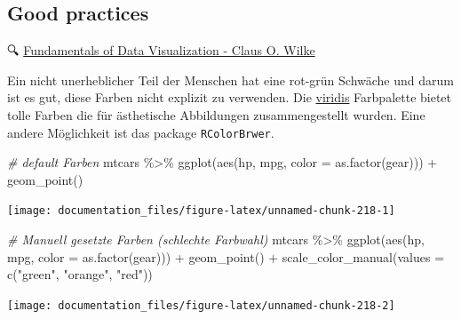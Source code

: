 \documentclass[
]{article}
\newenvironment{Shaded}{\begin{snugshade}}{\end{snugshade}}
\newcommand{\AttributeTok}[1]{\textcolor[rgb]{0.77,0.63,0.00}{#1}}
\newcommand{\CommentTok}[1]{\textcolor[rgb]{0.56,0.35,0.01}{\textit{#1}}}
\newcommand{\FunctionTok}[1]{\textcolor[rgb]{0.00,0.00,0.00}{#1}}
\newcommand{\NormalTok}[1]{#1}
\newcommand{\SpecialCharTok}[1]{\textcolor[rgb]{0.00,0.00,0.00}{#1}}
\newcommand{\StringTok}[1]{\textcolor[rgb]{0.31,0.60,0.02}{#1}}
\begin{document}
\hypertarget{good-practices}{%
\subsection{Good practices}\label{good-practices}}

🔍 \href{https://clauswilke.com/dataviz/index.html}{Fundamentals of Data Visualization - Claus O. Wilke}

Ein nicht unerheblicher Teil der Menschen hat eine rot-grün Schwäche und darum ist es gut, diese Farben nicht explizit zu verwenden. Die \href{https://www.thinkingondata.com/something-about-viridis-library/}{viridis} Farbpalette bietet tolle Farben die für ästhetische Abbildungen zusammengestellt wurden. Eine andere Möglichkeit ist das package \texttt{RColorBrwer}.

\begin{Shaded}
\begin{Highlighting}[]
\CommentTok{\# default Farben}
\NormalTok{mtcars }\SpecialCharTok{\%\textgreater{}\%}
  \FunctionTok{ggplot}\NormalTok{(}\FunctionTok{aes}\NormalTok{(hp, mpg, }\AttributeTok{color =} \FunctionTok{as.factor}\NormalTok{(gear))) }\SpecialCharTok{+}
  \FunctionTok{geom\_point}\NormalTok{()}
\end{Highlighting}
\end{Shaded}

\begin{center}\texttt{[image: documentation\_files/figure-latex/unnamed-chunk-218-1]} \end{center}

\begin{Shaded}
\begin{Highlighting}[]
\CommentTok{\# Manuell gesetzte Farben (schlechte Farbwahl)}
\NormalTok{mtcars }\SpecialCharTok{\%\textgreater{}\%}
  \FunctionTok{ggplot}\NormalTok{(}\FunctionTok{aes}\NormalTok{(hp, mpg, }\AttributeTok{color =} \FunctionTok{as.factor}\NormalTok{(gear))) }\SpecialCharTok{+}
  \FunctionTok{geom\_point}\NormalTok{() }\SpecialCharTok{+}
  \FunctionTok{scale\_color\_manual}\NormalTok{(}\AttributeTok{values =} \FunctionTok{c}\NormalTok{(}\StringTok{"green"}\NormalTok{, }\StringTok{"orange"}\NormalTok{, }\StringTok{"red"}\NormalTok{))}
\end{Highlighting}
\end{Shaded}

\begin{center}\texttt{[image: documentation\_files/figure-latex/unnamed-chunk-218-2]} \end{center}
\end{document}
